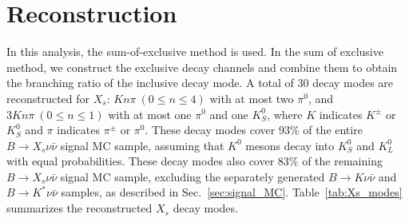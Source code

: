 \section{Reconstruction}
\label{sec:reconstruction}
In this analysis, the sum-of-exclusive method is used.
In the sum of exclusive method, we construct the exclusive decay channels and combine them to obtain the branching ratio of the inclusive decay mode.
A total of 30 decay modes are reconstructed for $X_{s}$: $Kn\pi~(0 \leq n \leq 4)$ with at most two $\pi^{0}$, and $3Kn\pi~(0 \leq n \leq 1)$ with at most one $\pi^{0}$ and one $K_{S}^{0}$, where $K$ indicates $K^{\pm}$ or $K_{S}^{0}$ and $\pi$ indicates $\pi^{\pm}$ or $\pi^{0}$.
These decay modes cover 93\% of the entire $B\rightarrow X_s\nu\bar{\nu}$ signal MC sample, assuming that $K^0$ mesons decay into $K_S^0$ and $K_L^0$ with equal probabilities.
These decay modes also cover 83\% of the remaining $B \rightarrow X_{s} \nu \bar{\nu}$ signal MC sample, excluding the separately generated $B \rightarrow K\nu\bar{\nu}$ and $B \rightarrow K^{*}\nu\bar{\nu}$ samples, as described in Sec.~\ref{sec:signal_MC}.
Table~\ref{tab:Xs_modes} summarizes the reconstructed $X_{s}$ decay modes.
